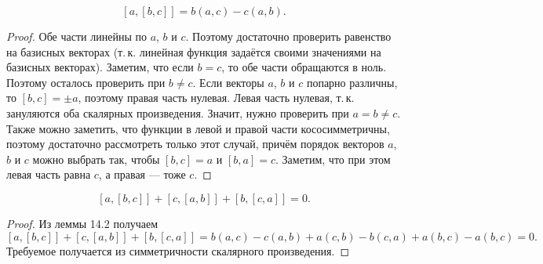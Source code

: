 \begin{lemma}
    $$
    [a, [b, c]] = b(a, c) - c(a, b).
    $$
\end{lemma}

\begin{proof}
    Обе части линейны по $a$, $b$ и $c$. Поэтому достаточно проверить равенство на базисных векторах (т.\,к. линейная функция задаётся своими значениями на базисных векторах). Заметим, что если $b = c$, то обе части обращаются в ноль. Поэтому осталось проверить при $b \ne c$. Если векторы $a$, $b$ и $c$ попарно различны, то $[b, c] = \pm a$, поэтому правая часть нулевая. Левая часть нулевая, т.\,к. зануляются оба скалярных произведения. Значит, нужно проверить при $a = b \ne c$. Также можно заметить, что функции в левой и правой части кососимметричны, поэтому достаточно рассмотреть только этот случай, причём порядок векторов $a$, $b$ и $c$ можно выбрать так, чтобы $[b, c] = a$ и $[b, a] = c$. Заметим, что при этом левая часть равна $c$, а правая --- тоже $c$. 
\end{proof}

\begin{theorem}
    $$
    [a, [b, c]] + [c, [a, b]] + [b, [c, a]] = 0.
    $$
\end{theorem}

\begin{proof}
    Из леммы 14.2 получаем
    $$
    [a, [b, c]] + [c, [a, b]] + [b, [c, a]] = b(a, c) - c(a, b) + a(c, b) - b(c, a) + a(b, c) - a(b, c) = 0.
    $$
    Требуемое получается из симметричности скалярного произведения.
\end{proof}


